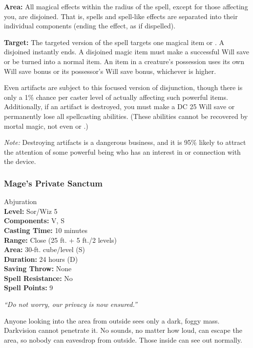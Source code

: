 \begin{list}{}{\leftmargin=1em}
 \item \textbf{Area:} All magical effects within the radius of the spell, except for those affecting you, are disjoined.
That is, spells and spell-like effects are separated into their individual components (ending the effect, as if dispelled). 
 \item \textbf{Target:} The targeted version of the spell targets one magical item or .
A disjoined  instantly ends.
A disjoined magic item must make a successful Will save or be turned into a normal item. 
An item in a creature's possession uses its own Will save bonus or its possessor's Will save bonus, whichever is higher.

Even artifacts are subject to this focused version of disjunction, though there is only a 1\% chance per caster level of actually affecting such powerful items. 
Additionally, if an artifact is destroyed, you must make a DC 25 Will save or permanently lose all spellcasting abilities. 
(These abilities cannot be recovered by mortal magic, not even  or .)

\emph{Note:} Destroying artifacts is a dangerous business, and it is 95\% likely to attract the attention of some powerful being who has an interest in or connection with the device. 
\end{list}
\subsubsection{Mage's Private Sanctum}
\label{Spell:PrivateSanctum}
Abjuration
\\ \textbf{Level:} Sor/Wiz 5
\\ \textbf{Components:} V, S
\\ \textbf{Casting Time:} 10 minutes
\\ \textbf{Range:} Close (25 ft. + 5 ft./2 levels)
\\ \textbf{Area:} 30-ft. cube/level (S)
\\ \textbf{Duration:} 24 hours (D)
\\ \textbf{Saving Throw:} None
\\ \textbf{Spell Resistance:} No
\\ \textbf{Spell Points:} 9

\emph{``Do not worry, our privacy is now ensured.''}

Anyone looking into the area from outside sees only a dark, foggy mass. 
Darkvision cannot penetrate it. No sounds, no matter how loud, can escape the area, 
so nobody can eavesdrop from outside. Those inside can see out normally.

